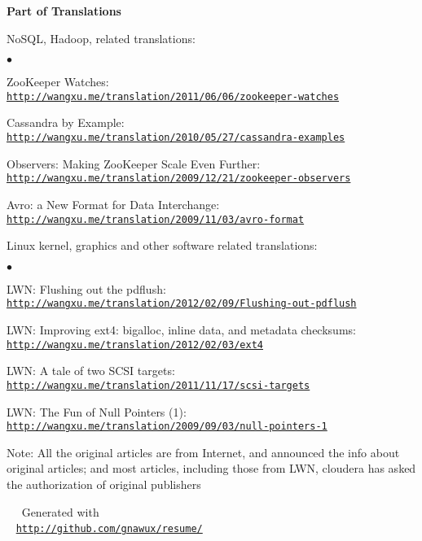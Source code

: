 \documentclass[a4paper,margin,line]{res}
\newenvironment{list1}{
  \begin{list}{\ding{113}}{%
      \setlength{\itemsep}{0in}
      \setlength{\parsep}{0in} \setlength{\parskip}{0in}
      \setlength{\topsep}{0in} \setlength{\partopsep}{0in} 
      \setlength{\leftmargin}{0.17in}}}{\end{list}}
\newenvironment{list2}{
  \begin{list}{$\bullet$}{%
      \setlength{\itemsep}{0in}
      \setlength{\parsep}{0in} \setlength{\parskip}{0in}
      \setlength{\topsep}{0in} \setlength{\partopsep}{0in} 
      \setlength{\leftmargin}{0.2in}}}{\end{list}}
\newcommand{\http}{http:/\hspace{-0.3ex}/}
\newcommand{\hindent}{\mbox{\hspace{8ex}}}
\begin{document}
\begin{resume}
\textbf{Part of Translations}\\
\vspace*{-.1in}
\begin{list1}
\item[] NoSQL, Hadoop, related translations:
\begin{list2}
\vspace*{.05in}
\item ZooKeeper Watches:\\
	\hindent\href{http://wangxu.me/translation/2011/06/06/zookeeper-watches}{\tt\http{}wangxu.me/translation/2011/06/06/zookeeper-watches}
\item Cassandra by Example:\\
	\hindent\href{http://wangxu.me/translation/2010/05/27/cassandra-examples}{\tt\http{}wangxu.me/translation/2010/05/27/cassandra-examples}
\item Observers: Making ZooKeeper Scale Even Further:\\
	\hindent\href{http://wangxu.me/translation/2009/12/21/zookeeper-observers}{\tt\http{}wangxu.me/translation/2009/12/21/zookeeper-observers}
\item Avro: a New Format for Data Interchange:\\
	\hindent\href{http://wangxu.me/translation/2009/11/03/avro-format}{\tt\http{}wangxu.me/translation/2009/11/03/avro-format}
\vspace*{.05in}
\end{list2}
\item[] Linux kernel, graphics and other software related translations:
\begin{list2}
\vspace*{.05in}
\item LWN: Flushing out the pdflush:\\
	\hindent\href{http://wangxu.me/translation/2012/02/09/Flushing-out-pdflush}{\tt\http{}wangxu.me/translation/2012/02/09/Flushing-out-pdflush}
\item LWN: Improving ext4: bigalloc, inline data, and metadata checksums: \\
	\hindent \href{http://wangxu.me/translation/2012/02/03/ext4}{\tt\http{}wangxu.me/translation/2012/02/03/ext4}
\item LWN: A tale of two SCSI targets:\\
	\hindent\href{http://wangxu.me/translation/2011/11/17/scsi-targets}{\tt \http{}wangxu.me/translation/2011/11/17/scsi-targets}
\item LWN: The Fun of Null Pointers (1): \\
	\hindent\href{http://wangxu.me/translation/2009/09/03/null-pointers-1}{\tt\http{}wangxu.me/translation/2009/09/03/null-pointers-1}
\end{list2}
\end{list1}
{\small \textsf{Note: All the original articles are from Internet, and announced the info about original articles; and most articles, including those from LWN, cloudera has asked the authorization of original publishers}}

\end{resume}

\vfill
\vfill
\mbox{ }\hspace{100pt}	\small\Resume\ Generated with \\
\mbox{ }\hspace{80pt}	\small\href{http://github.com/gnawux/resume/}{\tt\http{}github.com/gnawux/resume/}
\end{document}
